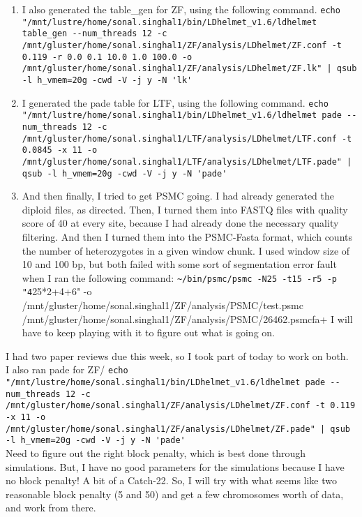 \documentclass[idxtotoc,hyperref,openany,oneside]{labbook} %
\begin{document}
\begin{enumerate}
\item I also generated the table\_gen for ZF, using the following command.
\verb+echo "/mnt/lustre/home/sonal.singhal1/bin/LDhelmet_v1.6/ldhelmet table_gen --num_threads 12 -c /mnt/gluster/home/sonal.singhal1/ZF/analysis/LDhelmet/ZF.conf -t 0.119 -r 0.0 0.1 10.0 1.0 100.0 -o /mnt/gluster/home/sonal.singhal1/ZF/analysis/LDhelmet/ZF.lk" | qsub -l h_vmem=20g -cwd -V -j y -N 'lk'+
\item I generated the pade table for LTF, using the following command.
\verb+echo "/mnt/lustre/home/sonal.singhal1/bin/LDhelmet_v1.6/ldhelmet pade --num_threads 12 -c /mnt/gluster/home/sonal.singhal1/LTF/analysis/LDhelmet/LTF.conf -t 0.0845 -x 11 -o /mnt/gluster/home/sonal.singhal1/LTF/analysis/LDhelmet/LTF.pade" | qsub -l h_vmem=20g -cwd -V -j y -N 'pade'+
\item And then finally, I tried to get PSMC going. I had already generated the diploid files, as directed. Then, I turned them into FASTQ files with quality score of 40 at every site, because I had already done the necessary quality filtering. And then I turned them into the PSMC-Fasta format, which counts the number of heterozygotes in a given window chunk. I used window size of 10 and 100 bp, but both failed with some sort of segmentation error fault when I ran the following command:
\verb+~/bin/psmc/psmc -N25 -t15 -r5 -p "4+25*2+4+6" -o /mnt/gluster/home/sonal.singhal1/ZF/analysis/PSMC/test.psmc /mnt/gluster/home/sonal.singhal1/ZF/analysis/PSMC/26462.psmcfa+
I will have to keep playing with it to figure out what is going on.
\end{enumerate}

I had two paper reviews due this week, so I took part of today to work on both. \\

I also ran pade for ZF/
\verb+echo "/mnt/lustre/home/sonal.singhal1/bin/LDhelmet_v1.6/ldhelmet pade --num_threads 12 -c /mnt/gluster/home/sonal.singhal1/ZF/analysis/LDhelmet/ZF.conf -t 0.119 -x 11 -o /mnt/gluster/home/sonal.singhal1/ZF/analysis/LDhelmet/ZF.pade" | qsub -l h_vmem=20g -cwd -V -j y -N 'pade'+ \\

Need to figure out the right block penalty, which is best done through simulations. But, I have no good parameters for the simulations because I have no block penalty! A bit of a Catch-22. So, I will try with what seems like two reasonable block penalty (5 and 50) and get a few chromosomes worth of data, and work from there. \\
\end{document}
